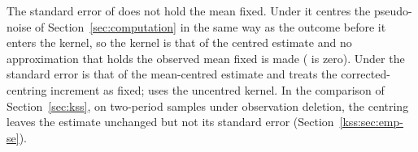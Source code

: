 The standard error of \fevc{} does not hold the mean fixed. Under  it centres the
pseudo-noise of Section~\ref{sec:computation} in the same way as the outcome before it enters the kernel, so the
kernel is that of the centred estimate and no approximation that holds the observed mean fixed is made
( is zero). Under  the standard error is that of the
mean-centred estimate and treats the corrected-centring increment as fixed;  uses the
uncentred kernel. In the comparison of Section~\ref{sec:kss}, on two-period samples under observation deletion,
the centring leaves the estimate unchanged but not its standard error (Section~\ref{kss:sec:emp-se}).

